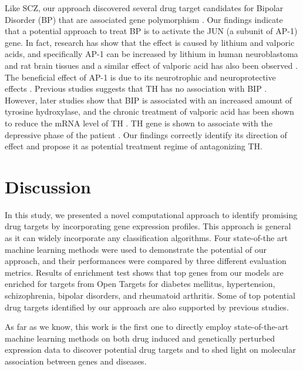     Like SCZ, our approach discovered several drug target candidates for Bipolar Disorder (BP) that are associated gene polymorphism \cite{lee2013pathway,zhang2015functional,golimbet2014study}. Our findings indicate that a potential approach to treat BP is to activate the JUN (a subunit of AP-1) gene. In fact, research has show that the effect is caused by lithium and valporic acids, and specifically AP-1 can be increased by lithium in human neuroblastoma and rat brain tissues and a similar effect of valporic acid has also been observed \cite{yuan1998lithium,asghari1998differential,ozaki1997lithium}. The beneficial effect of AP-1 is due to its neurotrophic and neuroprotective effects \cite{machado2009role}. Previous studies suggests that TH has no association with BIP \cite{grassi1996no,turecki1997lack}. However, later studies show that BIP is associated with an increased amount of tyrosine hydroxylase, and the chronic treatment of valporic acid has been shown to reduce the mRNA level of TH \cite{pantazopoulos2004differences,muglia2002dopamine}. TH gene is shown to associate with the depressive phase of the patient \cite{muglia2002dopamine}. Our findings correctly identify its direction of effect and propose it as potential treatment regime of antagonizing TH.

\section{Discussion}
  In this study, we presented a novel computational approach to identify promising drug targets by incorporating gene expression profiles. This approach is general as it can widely incorporate any classification algorithms. Four state-of-the art machine learning methods were used to demonstrate the potential of our approach, and their performances were compared by three different evaluation metrics. Results of enrichment test shows that top genes from our models are enriched for targets from Open Targets for diabetes mellitus, hypertension, schizophrenia, bipolar disorders, and rheumatoid arthritis. Some of top potential drug targets identified by our approach are also supported by previous studies. 

  As far as we know, this work is the first one to directly employ state-of-the-art machine learning methods on both drug induced and genetically perturbed expression data to discover potential drug targets and to shed light on molecular association between genes and diseases. 

